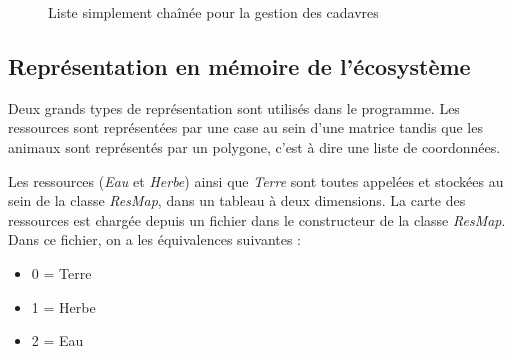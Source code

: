 \documentclass[a4paper,11pt,final,oneside]{article}
\begin{document}
\begin{figure}[h!]
\centering		
{}
\caption{Liste simplement chaînée pour la gestion des cadavres}
\label{fig:rep}
\end{figure}

		\subsection{Représentation en mémoire de l'écosystème}
Deux grands types de représentation sont utilisés dans le programme. Les ressources sont représentées par une case au sein d'une matrice tandis que les animaux sont représentés par un polygone, c'est à dire une liste de coordonnées.

Les ressources (\textit{Eau} et \textit{Herbe}) ainsi que \textit{Terre} sont toutes appelées et stockées au sein de la classe \textit{ResMap}, dans un tableau à deux dimensions. La carte des ressources est chargée depuis un fichier dans le constructeur de la classe \textit{ResMap}. Dans ce fichier, on a les équivalences suivantes :
\medskip
\begin{itemize}
	\item 0 = Terre
	\item 1 = Herbe
	\item 2 = Eau
\end{itemize}
\medskip
\end{document}
